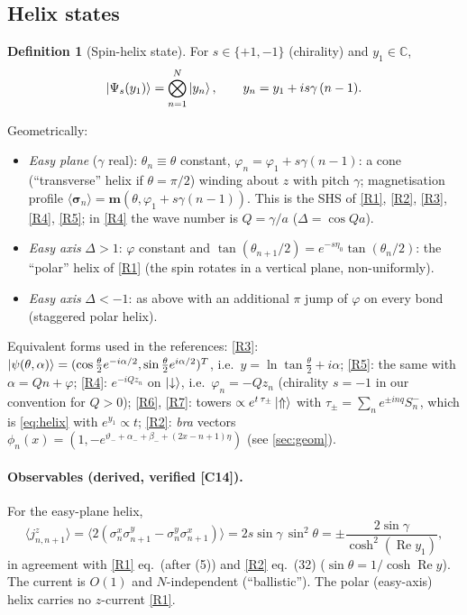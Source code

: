 \documentclass[11pt,a4paper]{article}
\theoremstyle{definition}
\newtheorem{definition}[theorem]{Definition}
\newcommand{\bsig}{\boldsymbol\sigma}
\newcommand{\ver}[1]{\textsf{[#1]}}   %
\newcommand{\re}{\operatorname{Re}}
\begin{document}
\subsection{Helix states}
\begin{definition}[Spin-helix state]\label{def:helix}
For $s\in\{+1,-1\}$ (chirality) and $y_1\in\mathbb C$,
\begin{equation}\label{eq:helix}
\ket{\Psi_s(y_1)}=\bigotimes_{n=1}^{N}\ket{y_n},\qquad y_n=y_1+i s\gamma\,(n-1).
\end{equation}
\end{definition}
Geometrically:
\begin{itemize}
\item \emph{Easy plane} ($\gamma$ real): $\theta_n\equiv\theta$ constant, $\varphi_n=\varphi_1+s\gamma(n-1)$: a cone (``transverse'' helix if $\theta=\pi/2$) winding about $z$ with pitch $\gamma$; magnetisation profile $\langle\bsig_n\rangle=\mathbf m(\theta,\varphi_1+s\gamma(n-1))$. This is the SHS of \ref{R1}, \ref{R2}, \ref{R3}, \ref{R4}, \ref{R5}; in \ref{R4} the wave number is $Q=\gamma/a$ ($\Delta=\cos Qa$).
\item \emph{Easy axis} $\Delta>1$: $\varphi$ constant and $\tan(\theta_{n+1}/2)=e^{-s\eta_0}\tan(\theta_n/2)$: the ``polar'' helix of \ref{R1} (the spin rotates in a vertical plane, non-uniformly).
\item \emph{Easy axis} $\Delta<-1$: as above with an additional $\pi$ jump of $\varphi$ on every bond (staggered polar helix).
\end{itemize}
Equivalent forms used in the references: \ref{R3}: $\ket{\psi(\theta,\alpha)}=(\cos\frac\theta2e^{-i\alpha/2},\sin\frac\theta2e^{i\alpha/2})^T$, i.e.\ $y=\ln\tan\frac\theta2+i\alpha$; \ref{R5}: the same with $\alpha=Qn+\varphi$; \ref{R4}: $e^{-iQz_n}$ on $\ket\downarrow$, i.e.\ $\varphi_n=-Qz_n$ (chirality $s=-1$ in our convention for $Q>0$); \ref{R6}, \ref{R7}: towers $\propto e^{t\,\tau_{\pm}}\ket{\Uparrow}$ with $\tau_\pm=\sum_n e^{\pm i n q}S_n^-$, which is \eqref{eq:helix} with $e^{y_1}\propto t$; \ref{R2}: \emph{bra} vectors $\phi_n(x)=(1,-e^{\vartheta_-+\alpha_-+\beta_-+(2x-n+1)\eta})$ (see \cref{sec:geom}).

\paragraph{Observables (derived, verified \ver{C14}).} For the easy-plane helix,
\begin{equation}\label{eq:current}
\langle j^z_{n,n+1}\rangle=\big\langle 2(\sigma^x_n\sigma^y_{n+1}-\sigma^y_n\sigma^x_{n+1})\big\rangle=2s\sin\gamma\,\sin^2\theta=\pm\frac{2\sin\gamma}{\cosh^2(\re y_1)},
\end{equation}
in agreement with \ref{R1} eq.~(after (5)) and \ref{R2} eq.~(32) ($\sin\theta=1/\cosh\re y$). The current is $O(1)$ and $N$-independent (``ballistic''). The polar (easy-axis) helix carries no $z$-current \ref{R1}.
\end{document}
